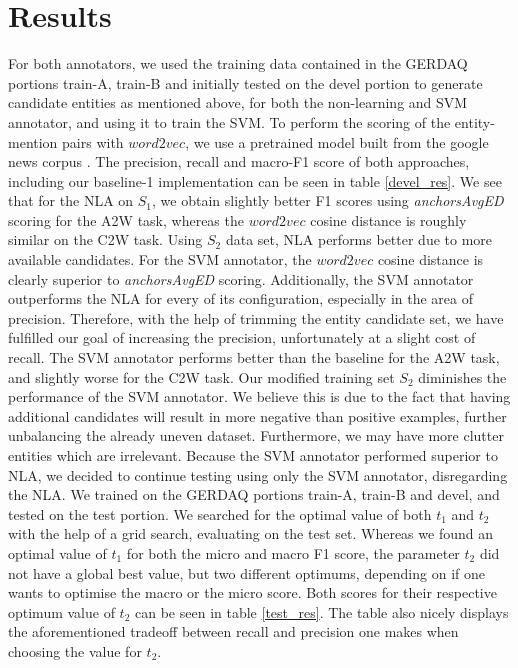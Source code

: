 \documentclass{article}
\begin{document}
\section{Results}
For both annotators, we used the training data contained in the GERDAQ portions train-A, train-B and initially tested on the devel portion to generate candidate entities as mentioned above, for both the non-learning and SVM annotator, and using it to train the SVM. To perform the scoring of the entity-mention pairs with $word2vec$, we use a pretrained model built from the google news corpus \cite{w2v}. The precision, recall and macro-F1 score of both approaches, including our baseline-1 implementation can be seen in table \ref{devel_res}. We see that for the NLA on $S_1$, we obtain slightly better F1 scores using \textit{anchorsAvgED} scoring for the A2W task, whereas the $word2vec$ cosine distance is roughly similar on the C2W task. Using $S_2$ data set, NLA performs better due to more available candidates. For the SVM annotator, the $word2vec$ cosine distance is clearly superior to \textit{anchorsAvgED} scoring. Additionally, the SVM annotator outperforms the NLA for every of its configuration, especially in the area of precision. Therefore, with the help of trimming the entity candidate set, we have fulfilled our goal of increasing the precision, unfortunately at a slight cost of recall. The SVM annotator performs better than the baseline for the A2W task, and slightly worse for the C2W task. Our modified training set $S_2$ diminishes the performance of the SVM annotator. We believe this is due to the fact that having additional candidates will result in more negative than positive examples, further unbalancing the already uneven dataset. Furthermore, we may have more clutter entities which are irrelevant. Because the SVM annotator performed superior to NLA, we decided to continue testing using only the SVM annotator, disregarding the NLA. We trained on the GERDAQ portions train-A, train-B and devel, and tested on the test portion. We searched for the optimal value of both $t_1$ and $t_2$ with the help of a grid search, evaluating on the test set. Whereas we found an optimal value of $t_1$ for both the micro and macro F1 score, the parameter $t_2$ did not have a global best value, but two different optimums, depending on if one wants to optimise the macro or the micro score. Both scores for their respective optimum value of $t_2$ can be seen in table \ref{test_res}. The table also nicely displays the aforementioned tradeoff between recall and precision one makes when choosing the value for $t_2$.
\end{document}

